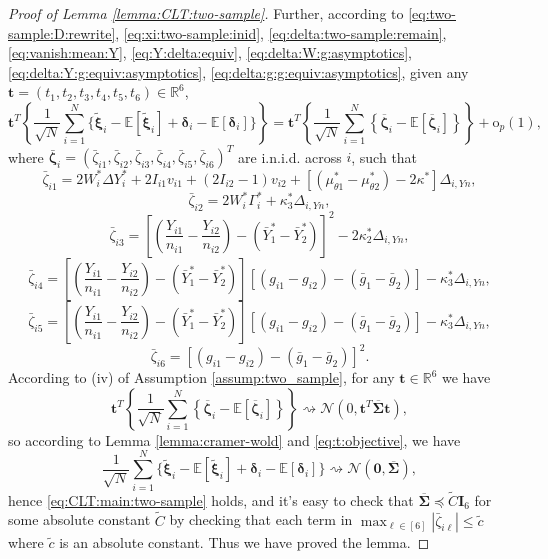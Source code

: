\documentclass[12pt,letterpaper]{article}
\begin{document}
\begin{proof}[Proof of Lemma \ref{lemma:CLT:two-sample}]
Further, according to \eqref{eq:two-sample:D:rewrite}, \eqref{eq:xi:two-sample:inid}, \eqref{eq:delta:two-sample:remain}, \eqref{eq:vanish:mean:Y}, \eqref{eq:Y:delta:equiv}, \eqref{eq:delta:W:g:asymptotics}, \eqref{eq:delta:Y:g:equiv:asymptotics}, \eqref{eq:delta:g:g:equiv:asymptotics}, given any $\mathbf{t}=(t_1,t_2,t_3,t_4,t_5,t_6)\in\mathbb{R}^6$,
\begin{equation}\label{eq:t:objective}
\mathbf{t}^T\left\{\frac{1}{\sqrt{N}}\sum_{i=1}^N\{\tilde{\boldsymbol{\xi}}_i-\mathbb{E}[\tilde{\boldsymbol{\xi}}_i]+\boldsymbol{\delta}_i-\mathbb{E}[\boldsymbol{\delta}_i]\}\right\}=\mathbf{t}^T\left\{\frac{1}{\sqrt{N}}\sum_{i=1}^N\left\{\overline{\boldsymbol{\zeta}}_i-\mathbb{E}[\overline{\boldsymbol{\zeta}}_i]\right\}\right\}+\mathrm{o}_p(1),
\end{equation}
where $\bar{\boldsymbol{\zeta}}_i=(\bar{\zeta}_{i1},\bar{\zeta}_{i2},\bar{\zeta}_{i3},\bar{\zeta}_{i4},\bar{\zeta}_{i5},\bar{\zeta}_{i6})^T$ are i.n.i.d. across $i$, such that 
$$\bar{\zeta}_{i1}=2W_i^*\Delta Y_i^*+2I_{i1}v_{i1}+(2I_{i2}-1)v_{i2}+[(\mu_{\theta1}^*-\mu_{\theta2}^*)-2\kappa^*]\Delta_{i,Yn},$$
$$\bar{\zeta}_{i2}=2W_i^*\Gamma_i^*+\kappa_3^*\Delta_{i,Yn},$$
$$\bar{\zeta}_{i3}=\left[\left(\frac{Y_{i1}}{n_{i1}}-\frac{Y_{i2}}{n_{i2}}\right)-(\bar{Y}_1^*-\bar{Y}_2^*)\right]^2-2\kappa_2^*\Delta_{i,Yn},$$
$$\bar{\zeta}_{i4}=\left[\left(\frac{Y_{i1}}{n_{i1}}-\frac{Y_{i2}}{n_{i2}}\right)-(\bar{Y}_1^*-\bar{Y}_2^*)\right][(g_{i1}-g_{i2})-(\bar{g}_1-\bar{g}_2)]-\kappa_3^*\Delta_{i,Yn},$$
$$\bar{\zeta}_{i5}=\left[\left(\frac{Y_{i1}}{n_{i1}}-\frac{Y_{i2}}{n_{i2}}\right)-(\bar{Y}_1^*-\bar{Y}_2^*)\right][(g_{i1}-g_{i2})-(\bar{g}_1-\bar{g}_2)]-\kappa_3^*\Delta_{i,Yn},$$
$$\bar{\zeta}_{i6}=[(g_{i1}-g_{i2})-(\bar{g}_1-\bar{g}_2)]^2.$$
According to (iv) of Assumption \ref{assump:two_sample}, for any $\mathbf{t}\in\mathbb{R}^6$ we have 
$$\mathbf{t}^T\left\{\frac{1}{\sqrt{N}}\sum_{i=1}^N\left\{\overline{\boldsymbol{\zeta}}_i-\mathbb{E}[\overline{\boldsymbol{\zeta}}_i]\right\}\right\}\rightsquigarrow\mathcal{N}\left(0,\mathbf{t}^T\overline{\boldsymbol{\Sigma}}\mathbf{t}\right),$$
so according to Lemma \ref{lemma:cramer-wold} and \eqref{eq:t:objective}, we have 
$$\frac{1}{\sqrt{N}}\sum_{i=1}^N\{\tilde{\boldsymbol{\xi}}_i-\mathbb{E}[\tilde{\boldsymbol{\xi}}_i]+\boldsymbol{\delta}_i-\mathbb{E}[\boldsymbol{\delta}_i]\}\rightsquigarrow\mathcal{N}\left(\mathbf{0},\overline{\boldsymbol{\Sigma}}\right),$$
hence \eqref{eq:CLT:main:two-sample} holds, and it's easy to check that $\overline{\boldsymbol{\Sigma}}\preceq\tilde{C}\mathbf{I}_6$ for some absolute constant $\tilde{C}$ by checking that each term in $\max_{\ell\in[6]}|\bar{\zeta}_{i\ell}|\leq\tilde{c}$ where $\tilde{c}$ is an absolute constant. Thus we have proved the lemma.
\end{proof}
\end{document}
